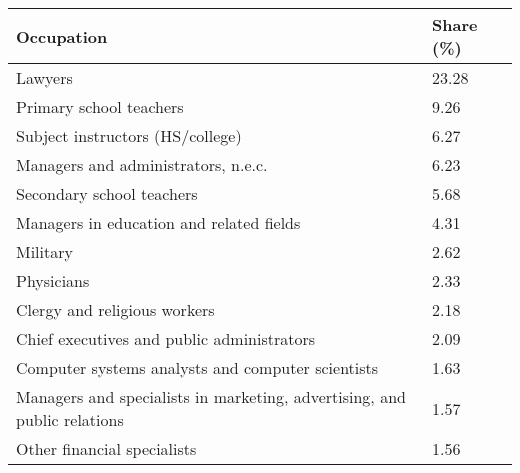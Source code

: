 

\begin{tabular}[t]{ll}
\toprule
Occupation & Share (\%)\\
\midrule
Lawyers & 23.28\\
Primary school teachers & 9.26\\
Subject instructors (HS/college) & 6.27\\
Managers and administrators, n.e.c. & 6.23\\
Secondary school teachers & 5.68\\
Managers in education and related fields & 4.31\\
Military & 2.62\\
Physicians & 2.33\\
Clergy and religious workers & 2.18\\
Chief executives and public administrators & 2.09\\
Computer systems analysts and computer scientists & 1.63\\
Managers and specialists in marketing, advertising, and public relations & 1.57\\
Other financial specialists & 1.56\\
\bottomrule
\end{tabular}

